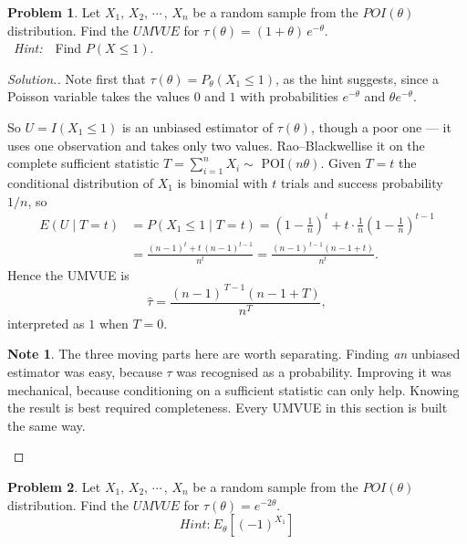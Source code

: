 \documentclass[12pt,a4paper]{report}
\theoremstyle{definition}
\newtheorem*{note}{Note}
\newtheorem{problemx}{Problem}[section]
\newenvironment{problem}{\begin{problemx}}{\end{problemx}}
\newenvironment{solution}
  {\renewcommand{\qedsymbol}{}\begin{proof}[\textit{Solution}.]}
  {\end{proof}}
\begin{document}
\begin{problem}
Let $X_1, \, X_2, \, \cdots\, , \, X_n$ be a random sample from the $POI(\theta)$ distribution. Find the $UMVUE$ for $\tau(\theta) = \left(1 + \theta\right)\, e^{-\theta}$.\\ \, \textit{Hint:}\, \, Find $P(X \leq 1)$.
\end{problem}

\begin{solution}
Note first that $\tau(\theta) = P_{\theta}\left(X_1\leq 1\right)$, as the hint
suggests, since a Poisson variable takes the values $0$ and $1$ with
probabilities $e^{-\theta}$ and $\theta e^{-\theta}$.

So $U = I\left(X_1\leq 1\right)$ is an unbiased estimator of $\tau(\theta)$,
though a poor one --- it uses one observation and takes only two values.
Rao--Blackwellise it on the complete sufficient statistic
$T=\sum_{i=1}^{n}X_i\sim$ POI$(n\theta)$. Given $T=t$ the conditional
distribution of $X_1$ is binomial with $t$ trials and success probability $1/n$,
so
\begin{align*}
E\left(U\mid T=t\right) &= P\left(X_1\leq 1\mid T=t\right)
 = \left(1-\frac1n\right)^{t} + t\cdot\frac1n\left(1-\frac1n\right)^{t-1}\\[2pt]
 &= \frac{(n-1)^{t} + t\,(n-1)^{t-1}}{n^{t}}
  = \frac{(n-1)^{\,t-1}\left(n-1+t\right)}{n^{t}} .
\end{align*}
Hence the UMVUE is
\[\widehat{\tau} = \frac{(n-1)^{\,T-1}\left(n-1+T\right)}{n^{T}},\]
interpreted as $1$ when $T=0$.

\begin{note}
The three moving parts here are worth separating. Finding \emph{an} unbiased
estimator was easy, because $\tau$ was recognised as a probability. Improving it
was mechanical, because conditioning on a sufficient statistic can only help.
Knowing the result is best required completeness. Every UMVUE in this section is
built the same way.
\end{note}
\end{solution}

\begin{problem}
Let $X_1, \, X_2, \, \cdots\, , \, X_n$ be a random sample from the $POI(\theta)$ distribution. Find the $UMVUE$ for $\tau(\theta) = e^{-2\theta}$.
\[\textit{Hint:}\  E_{\theta}\left[(-1)^{X_1}\right]\]
\end{problem}
\end{document}
